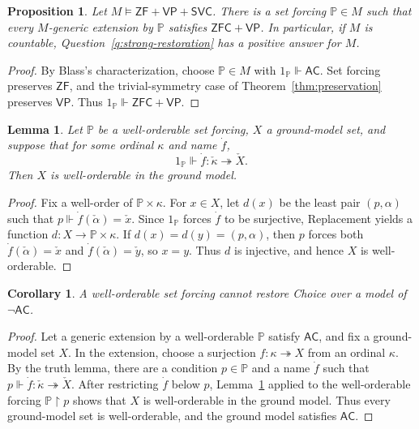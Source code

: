 \documentclass[11pt,a4paper]{amsart}
\newcommand{\VP}{\mathsf{VP}}
\newcommand{\AC}{\mathsf{AC}}
\newcommand{\ZF}{\mathsf{ZF}}
\newcommand{\ZFC}{\mathsf{ZFC}}
\theoremstyle{plain}
\newtheorem{proposition}[theorem]{Proposition}
\newtheorem{lemma}[theorem]{Lemma}
\newtheorem{corollary}[theorem]{Corollary}
\theoremstyle{definition}
\theoremstyle{remark}
\begin{document}
\begin{proposition}\label{prop:SVC-restoration}
Let $M\models\ZF+\VP+\mathsf{SVC}$.  There is a set forcing $\mathbb P\in M$ such that every $M$-generic extension by $\mathbb P$ satisfies $\ZFC+\VP$.  In particular, if $M$ is countable, Question~\ref{q:strong-restoration} has a positive answer for $M$.
\end{proposition}

\begin{proof}
By Blass's characterization, choose $\mathbb P\in M$ with $1_{\mathbb P}\Vdash\AC$.  Set forcing preserves $\ZF$, and the trivial-symmetry case of Theorem~\ref{thm:preservation} preserves $\VP$.  Thus $1_{\mathbb P}\Vdash\ZFC+\VP$.
\end{proof}

\begin{lemma}\label{lem:wellorderable-forcing}
Let $\mathbb P$ be a well-orderable set forcing, $X$ a ground-model set, and suppose that for some ordinal $\kappa$ and name $\dot f$,
\[
1_{\mathbb P}\Vdash\dot f:\check\kappa\twoheadrightarrow\check X.
\]
Then $X$ is well-orderable in the ground model.
\end{lemma}

\begin{proof}
Fix a well-order of $\mathbb P\times\kappa$.  For $x\in X$, let $d(x)$ be the least pair $(p,\alpha)$ such that $p\Vdash\dot f(\check\alpha)=\check x$.  Since $1_{\mathbb P}$ forces $\dot f$ to be surjective, Replacement yields a function $d:X\longrightarrow\mathbb P\times\kappa$.
If $d(x)=d(y)=(p,\alpha)$, then $p$ forces both $\dot f(\check\alpha)=\check x$ and $\dot f(\check\alpha)=\check y$, so $x=y$.  Thus $d$ is injective, and hence $X$ is well-orderable.
\end{proof}

\begin{corollary}\label{cor:wellorderable-no-choice-restoration}
A well-orderable set forcing cannot restore Choice over a model of $\neg\AC$.
\end{corollary}

\begin{proof}
Let a generic extension by a well-orderable $\mathbb P$ satisfy $\AC$, and fix a ground-model set $X$.  In the extension, choose a surjection $f:\kappa\twoheadrightarrow X$ from an ordinal $\kappa$.  By the truth lemma, there are a condition $p\in\mathbb P$ and a name $\dot f$ such that $p\Vdash\dot f:\check\kappa\twoheadrightarrow\check X$.  After restricting $\dot f$ below $p$, Lemma~\ref{lem:wellorderable-forcing} applied to the well-orderable forcing $\mathbb P\mathbin{\restriction}p$ shows that $X$ is well-orderable in the ground model.  Thus every ground-model set is well-orderable, and the ground model satisfies $\AC$.
\end{proof}
\end{document}
